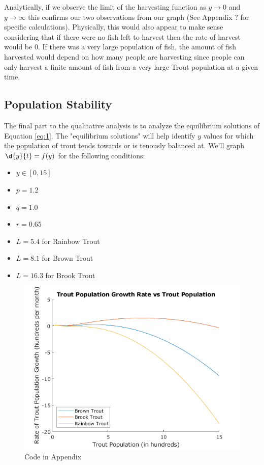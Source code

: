 \documentclass[letterpaper,12pt]{article}
\begin{document}
Analytically, if we observe the limit of the harvesting function as \(y\to 0\) and \(y\to \infty\) this confirms our two observations from our graph (See Appendix ? for specific calculations). 
Physically, this would also appear to make sense considering that if there were no fish left to harvest then the rate of harvest would be 0. 
If there was a very large population of fish, the amount of fish harvested would depend on how many people are harvesting since people can only harvest a finite amount of fish from a very large Trout population at a given time.
\subsection{Population Stability}
The final part to the qualitative analysis is to analyze the equilibrium solutions of Equation \eqref{eq:1}. The "equilibrium solutions" will help identify \(y\) values for which the population of trout tends towards or is tenously balanced at. We'll graph \(\d{y}{t} = f(y)\) for the following conditions:
\begin{itemize}
    \item \(y \in [0, 15]\)
    \item \(p = 1.2\)
    \item \(q = 1.0\)
    \item \(r = 0.65\)
    \item \(L = 5.4\) for Rainbow Trout
    \item \(L = 8.1\) for Brown Trout
    \item \(L = 16.3\) for Brook Trout
\end{itemize}
\begin{figure}[H]
    \centering
    \includegraphics{./figures/fig.3.4.1.png}
    \caption{Code in Appendix}
    \label{fig:3}
\end{figure}
\end{document}
